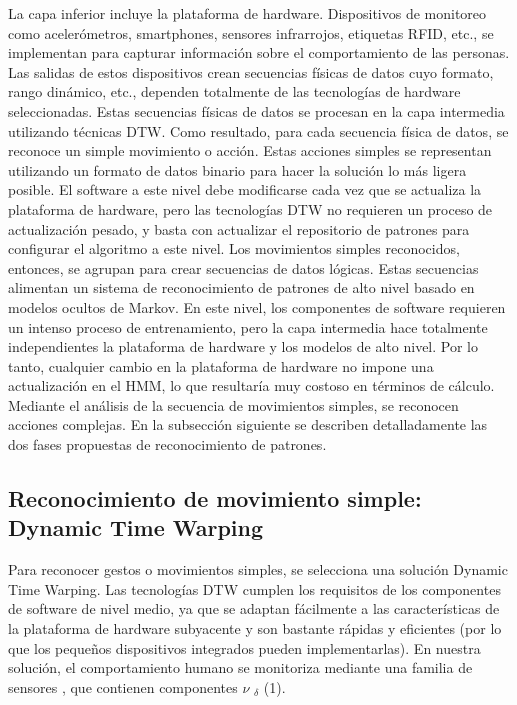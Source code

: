 \documentclass[a4paper]{article}
\begin{document}
La capa inferior incluye la plataforma de hardware. Dispositivos de monitoreo como acelerómetros, smartphones, sensores infrarrojos, etiquetas RFID, etc., se implementan para capturar información sobre el comportamiento de las personas. Las salidas de estos dispositivos crean secuencias físicas de datos cuyo formato, rango dinámico, etc., dependen totalmente de las tecnologías de hardware seleccionadas.
Estas secuencias físicas de datos se procesan en la capa intermedia utilizando técnicas DTW. Como resultado, para cada secuencia física de datos, se reconoce un simple movimiento o acción. Estas acciones simples se representan utilizando un formato de datos binario para hacer la solución lo más ligera posible. El software a este nivel debe modificarse cada vez que se actualiza la plataforma de hardware, pero las tecnologías DTW no requieren un proceso de actualización pesado, y basta con actualizar el repositorio de patrones para configurar el algoritmo a este nivel.
Los movimientos simples reconocidos, entonces, se agrupan para crear secuencias de datos lógicas. Estas secuencias alimentan un sistema de reconocimiento de patrones de alto nivel basado en modelos ocultos de Markov. En este nivel, los componentes de software requieren un intenso proceso de entrenamiento, pero la capa intermedia hace totalmente independientes la plataforma de hardware y los modelos de alto nivel. Por lo tanto, cualquier cambio en la plataforma de hardware no impone una actualización en el HMM, lo que resultaría muy costoso en términos de cálculo. Mediante el análisis de la secuencia de movimientos simples, se reconocen acciones complejas.
En la subsección siguiente se describen detalladamente las dos fases propuestas de reconocimiento de patrones.

\subsection{Reconocimiento de movimiento simple: Dynamic Time Warping}

Para reconocer gestos o movimientos simples, se selecciona una solución Dynamic Time Warping. Las tecnologías DTW cumplen los requisitos de los componentes de software de nivel medio, ya que se adaptan fácilmente a las características de la plataforma de hardware subyacente y son bastante rápidas y eficientes (por lo que los pequeños dispositivos integrados pueden implementarlas).
En nuestra solución, el comportamiento humano se monitoriza mediante una familia de sensores  \delta, que contienen componentes  $\nu$ $_\delta$  (1).
\end{document}
